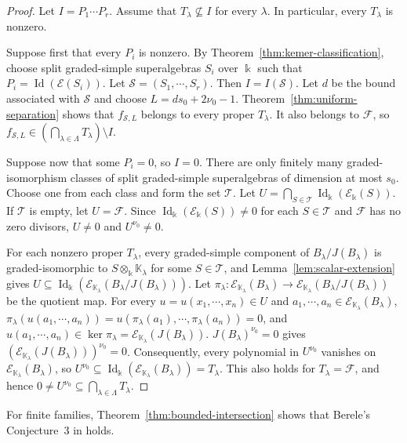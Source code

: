 \documentclass[11pt,reqno]{amsart}
\newcommand{\kk}{\Bbbk}
\newcommand{\KK}{\mathbb{K}}
\newcommand{\F}{\mathcal F}
\newcommand{\E}{\mathcal E}
\newcommand{\Id}{\operatorname{Id}}
\theoremstyle{definition}
\theoremstyle{remark}
\numberwithin{equation}{section}
\begin{document}
\begin{proof}
Let $I=P_1\cdots P_r$. Assume that $T_\lambda\nsubseteq I$ for every $\lambda$. In particular, every $T_\lambda$ is nonzero.

Suppose first that every $P_i$ is nonzero.
By Theorem~\ref{thm:kemer-classification}, choose split graded-simple
superalgebras $S_i$ over $\kk$ such that
$P_i=\Id(\E(S_i))$.
Let $\mathcal S=(S_1,\cdots,S_r)$. Then $I=I(\mathcal S)$.
Let $d$ be the bound associated with $\mathcal S$ and choose $L=ds_0+2\nu_0-1$.
Theorem~\ref{thm:uniform-separation} shows that
$f_{\mathcal S,L}$ belongs to every proper $T_\lambda$.
It also belongs to $\F$, so
$
f_{\mathcal S,L}\in
(\bigcap_{\lambda\in\Lambda}T_\lambda)\setminus I$.

Suppose now that some $P_i=0$, so $I=0$.
There are only finitely many graded-isomorphism classes
of split graded-simple superalgebras of dimension at most
$s_0$. 
Choose one from each class and form the set 
$\mathcal T$. Let
$
U=\bigcap_{S\in\mathcal T}\Id_{\kk}(\E_{\kk}(S))$.
If $\mathcal T$ is empty, let $U=\F$. Since $\Id_{\kk}(\E_{\kk}(S)) \neq 0$ for each $S\in\mathcal T$ and $\F$ has no zero divisors, $U\ne0$ and $U^{\nu_0}\ne0$.



For each nonzero proper $T_\lambda$, every
graded-simple component of
$B_\lambda/J(B_\lambda)$ is graded-isomorphic
to $S\otimes_\kk \KK_\lambda$ for some
$S\in\mathcal T$, and Lemma~\ref{lem:scalar-extension} gives
$U\subseteq
\Id_\kk(\E_{\KK_\lambda}(B_\lambda/J(B_\lambda)))$. Let $
\pi_\lambda:\E_{\KK_\lambda}(B_\lambda)
\longrightarrow
\E_{\KK_\lambda}(B_\lambda/J(B_\lambda))$
be the quotient map. For every $u=u(x_1,\cdots,x_n)\in U$ and
$a_1,\cdots,a_n\in\E_{\KK_\lambda}(B_\lambda)$, $
\pi_\lambda(u(a_1,\cdots,a_n))
=u(\pi_\lambda(a_1),\cdots,\pi_\lambda(a_n))
=0$, and $u(a_1,\cdots,a_n) \in \ker\pi_\lambda=\E_{\KK_\lambda}(J(B_{\lambda}))$.
 $J(B_\lambda)^{\nu_0}=0$ gives $
(\E_{\KK_\lambda}(J(B_\lambda)))^{\nu_0}=0$.
Consequently, every polynomial in $U^{\nu_0}$
vanishes on $\E_{\KK_\lambda}(B_\lambda)$, so $
U^{\nu_0}\subseteq
\Id_\kk(\E_{\KK_\lambda}(B_\lambda))
=T_\lambda$.
This also holds for $T_\lambda=\F$, and hence
$0\ne U^{\nu_0}\subseteq\bigcap_{\lambda\in\Lambda}T_\lambda$.

\end{proof}

For finite families, Theorem~\ref{thm:bounded-intersection}
shows that Berele's Conjecture~3 in \cite{Berele2012} holds.
\end{document}
